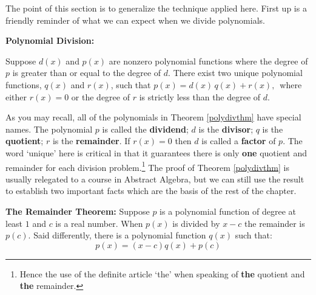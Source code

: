 \documentclass{ximera}
\begin{document}
The point of this section is to generalize the technique applied here.  First up is a friendly reminder of what we can expect when we divide polynomials.

\smallskip


\begin{theorem} \label{polydivthm} \textbf{Polynomial Division:} 

Suppose $d(x)$ and $p(x)$ are nonzero polynomial functions where the degree of $p$ is greater than or equal to the degree of $d$.  There exist two unique polynomial functions, $q(x)$ and $r(x)$, such that $p(x) = d(x) \, q(x) + r(x),\,$ where either $r(x) = 0$ or the degree of $r$ is strictly less than the degree of $d$.
\end{theorem}

 

As you may recall, all of the polynomials in Theorem \ref{polydivthm} have special names.  The polynomial $p$ is called the  \textbf{dividend}; $d$ is the  \textbf{divisor}; $q$ is the  \textbf{quotient}; $r$ is the  \textbf{remainder}.  If $r(x)=0$ then $d$ is called a  \textbf{factor} of $p$.  The word `unique' here is critical in that it guarantees there is only \textbf{one} quotient and remainder for each division problem.\footnote{Hence the use of the definite article `the' when speaking of \textbf{the} quotient and \textbf{the} remainder.} The proof of Theorem \ref{polydivthm} is usually relegated to a course in Abstract Algebra, but we can still use the result to establish two important facts which are the basis of the rest of the chapter.

 


\begin{theorem} \label{remainderthm}\textbf{The Remainder Theorem:}  
Suppose $p$ is a polynomial function of degree at least $1$ and $c$ is a real number.  When $p(x)$ is divided by $x-c$ the remainder is $p(c)$.  Said differently, there is a polynomial  function $q(x)$ such that:  \[ p(x) = (x-c) q(x) + p(c)\]

\end{theorem}

 
\end{document}
